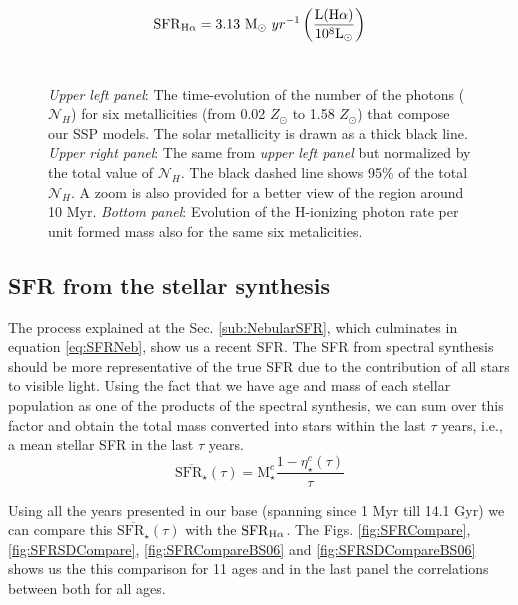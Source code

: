 \documentclass[a4paper,11pt]{article}
\begin{document}
\begin{equation}
	\label{eq:SFRNeb}
	\mathrm{SFR}_{\Halpha} = 3.13\ \mathrm{M}_\odot\ yr^{-1} \left(\frac{\mathrm{L}(\Halpha)}{10^8\mathrm{L}_\odot}\right)
\end{equation}
\
\begin{figure*}
\caption{\emph{Upper left panel}: The time-evolution of the number of the photons ($\mathcal{N}_H$) for six metallicities (from 0.02 $Z_\odot$ to 1.58 $Z_\odot$) that compose our SSP models. The solar metallicity is drawn as a thick black line. \emph{Upper right panel}: The same from \emph{upper left panel} but normalized by the total value of $\mathcal{N}_H$. The black dashed line shows 95\% of the total $\mathcal{N}_H$. A zoom is also provided for a better view of the region around 10 Myr. \emph{Bottom panel}: Evolution of the H-ionizing photon rate per unit formed mass also for the same six metalicities.}
\label{fig:Nh_qh}
\end{figure*}

\subsection{SFR from the stellar synthesis}
\label{sub:StellarSFR}
The process explained at the Sec. \ref{sub:NebularSFR}, which culminates in equation
\eqref{eq:SFRNeb}, show us a recent SFR.  The SFR from spectral synthesis should be more
representative of the true SFR due to the contribution of all stars to visible light. Using the fact
that we have age and mass of each stellar population as one of the products of the spectral
synthesis, we can sum over this factor and obtain the total mass converted into stars within the
last $\tau$ years, i.e., a mean stellar SFR in the last $\tau$ years.
\begin{equation}
	\label{eq:MeanStellarSFR}
	\overline{\mathrm{SFR}_\star}(\tau) = \mathrm{M}_\star^c \frac{1 - \eta_\star^c(\tau)}{\tau}
\end{equation}

Using all the years presented in our base (spanning since 1 Myr till 14.1 Gyr) we can compare this
$\overline{\mathrm{SFR}_\star}(\tau)$ with the $\mathrm{SFR}_{\Halpha}$. The Figs.
\ref{fig:SFRCompare}, \ref{fig:SFRSDCompare}, \ref{fig:SFRCompareBS06} and
\ref{fig:SFRSDCompareBS06} shows us the this comparison for 11 ages and in the last panel the
correlations between both for all ages.
\end{document}
